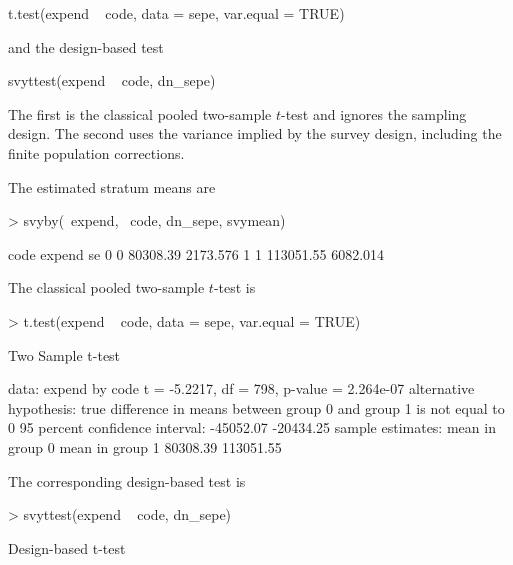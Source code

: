 \begin{Problem}
\begin{Subtask}
\begin{Scode}
t.test(expend ~ code, data = sepe, var.equal = TRUE)
\end{Scode}

        and the design-based test

\begin{Scode}
svyttest(expend ~ code, dn_sepe)
\end{Scode}

        The first is the classical pooled two-sample $t$-test and ignores the
        sampling design. The second uses the variance implied by the survey
        design, including the finite population corrections.

    \begin{Solution}
        The estimated stratum means are

\begin{Schunk}
\begin{Sinput}
> svyby(~expend, ~code, dn_sepe, svymean)
\end{Sinput}
\begin{Soutput}
  code    expend       se
0    0  80308.39 2173.576
1    1 113051.55 6082.014
\end{Soutput}
\end{Schunk}

        The classical pooled two-sample $t$-test is

\begin{Schunk}
\begin{Sinput}
> t.test(expend ~ code, data = sepe, var.equal = TRUE)
\end{Sinput}
\begin{Soutput}
	Two Sample t-test

data:  expend by code
t = -5.2217, df = 798, p-value = 2.264e-07
alternative hypothesis: true difference in means between group 0 and group 1 is not equal to 0
95 percent confidence interval:
 -45052.07 -20434.25
sample estimates:
mean in group 0 mean in group 1 
       80308.39       113051.55 
\end{Soutput}
\end{Schunk}

        The corresponding design-based test is

\begin{Schunk}
\begin{Sinput}
> svyttest(expend ~ code, dn_sepe)
\end{Sinput}
\begin{Soutput}
	Design-based t-test


\end{Soutput}
\end{Schunk}
\end{Solution}
\end{Subtask}
\end{Problem}
